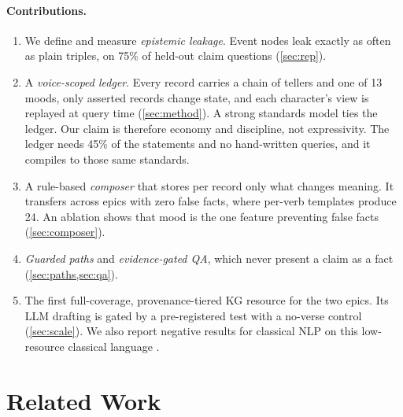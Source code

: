 \documentclass[11pt]{article}
\begin{document}
\paragraph{Contributions.}
\begin{enumerate}
\item We define and measure \emph{epistemic leakage}. Event nodes leak exactly as often as plain triples, on 75\% of held-out claim questions (\cref{sec:rep}).
\item A \emph{voice-scoped ledger}. Every record carries a chain of tellers and one of 13 moods, only asserted records change state, and each character's view is replayed at query time (\cref{sec:method}). A strong standards model ties the ledger. Our claim is therefore economy and discipline, not expressivity. The ledger needs 45\% of the statements and no hand-written queries, and it compiles to those same standards.
\item A rule-based \emph{composer} that stores per record only what changes meaning. It transfers across epics with zero false facts, where per-verb templates produce 24. An ablation shows that mood is the one feature preventing false facts (\cref{sec:composer}).
\item \emph{Guarded paths} and \emph{evidence-gated QA}, which never present a claim as a fact (\cref{sec:paths,sec:qa}).
\item The first full-coverage, provenance-tiered KG resource for the two epics. Its LLM drafting is gated by a pre-registered test with a no-verse control (\cref{sec:scale}). We also report negative results for classical NLP on this low-resource classical language \citep{Joshi2020StateFate}.
\end{enumerate}

\section{Related Work}
\label{sec:related}
\end{document}
